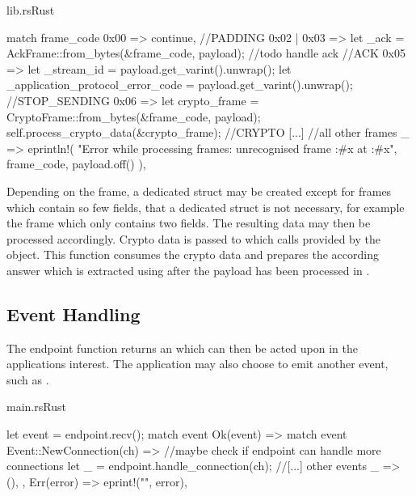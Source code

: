 \begin{codeblock}{lib.rs}{Rust}
    \begin{rustcode}
        match frame_code {
            0x00 => continue, //PADDING
            0x02 | 0x03 => {
                let _ack = AckFrame::from_bytes(&frame_code, payload);
                //todo handle ack
            } //ACK
            0x05 => {
                let _stream_id = payload.get_varint().unwrap();
                let _application_protocol_error_code = payload.get_varint().unwrap();
            } //STOP_SENDING
            0x06 => {
                let crypto_frame = CryptoFrame::from_bytes(&frame_code, payload);
                self.process_crypto_data(&crypto_frame);
            } //CRYPTO
            [...] //all other frames
            _ => eprintln!(
                "Error while processing frames: unrecognised frame {:#x} at {:#x}",
                frame_code,
                payload.off()
            ),
        }
    \end{rustcode}
    \label{process_payload_code}
\end{codeblock}

Depending on the frame, a dedicated struct may be created except for frames which contain so few fields, that a dedicated struct
is not necessary, for example the  frame which only contains two fields. The resulting data may then be processed
accordingly. Crypto data is passed to  which calls  provided by the
 object. This function consumes the crypto data and prepares the according answer which is extracted
using  after the payload has been processed in .

\subsection{Event Handling}

The endpoint function  returns an  which can then be acted upon in the applications interest. The
application may also choose to emit another event, such as .

\begin{codeblock}{main.rs}{Rust}
    \begin{rustcode}
        let event = endpoint.recv();
        match event {
            Ok(event) => match event {
                Event::NewConnection(ch) => {
                    //maybe check if endpoint can handle more connections
                    let _ = endpoint.handle_connection(ch);
                }
                //[...] other events
                _ => (),
            },
            Err(error) => eprint!("{}", error),
        }
    \end{rustcode}
    \label{event_handling_main}
\end{codeblock}

